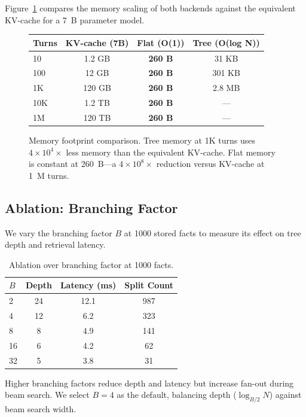 \documentclass[conference]{IEEEtran}
\begin{document}
Figure~\ref{fig:scaling} compares the memory scaling of both backends against the equivalent KV-cache for a 7~B parameter model.

\begin{figure}[t]
\centering
\begin{tabular}{lccc}
\toprule
Turns & KV-cache (7B) & Flat (O(1)) & Tree (O(log N)) \\
\midrule
10    & 1.2 GB        & \textbf{260 B} & 31 KB    \\
100   & 12 GB         & \textbf{260 B} & 301 KB   \\
1K    & 120 GB        & \textbf{260 B} & 2.8 MB   \\
10K   & 1.2 TB        & \textbf{260 B} & ---      \\
1M    & 120 TB        & \textbf{260 B} & ---      \\
\bottomrule
\end{tabular}
\caption{Memory footprint comparison. Tree memory at 1K turns uses $4\times 10^4\times$ less memory than the equivalent KV-cache. Flat memory is constant at 260~B---a $4\times 10^8\times$ reduction versus KV-cache at 1~M turns.}
\label{fig:scaling}
\end{figure}

\subsection{Ablation: Branching Factor}

We vary the branching factor $B$ at 1000 stored facts to measure its effect on tree depth and retrieval latency.

\begin{table}[t]
\centering
\caption{Ablation over branching factor at 1000 facts.}
\label{tab:ablation}
\begin{tabular}{lccc}
\toprule
$B$ & Depth & Latency (ms) & Split Count \\
\midrule
2   & 24    & 12.1         & 987    \\
4   & 12    & 6.2          & 323    \\
8   & 8     & 4.9          & 141    \\
16  & 6     & 4.2          & 62     \\
32  & 5     & 3.8          & 31     \\
\bottomrule
\end{tabular}
\end{table}

Higher branching factors reduce depth and latency but increase fan-out during beam search. We select $B=4$ as the default, balancing depth ($\log_{B/2} N$) against beam search width.
\end{document}
